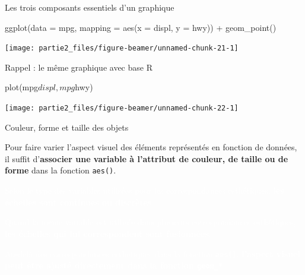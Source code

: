 \documentclass[12pt,ignorenonframetext,]{beamer}
\newenvironment{Shaded}{}{}
\newcommand{\KeywordTok}[1]{\textcolor[rgb]{0.00,0.00,1.00}{#1}}
\newcommand{\DataTypeTok}[1]{#1}
\newcommand{\StringTok}[1]{\textcolor[rgb]{0.00,0.50,0.50}{#1}}
\newcommand{\OperatorTok}[1]{#1}
\newcommand{\NormalTok}[1]{#1}
\renewenvironment{Shaded}{\begin{snugshade}}{\end{snugshade}}
\begin{document}
\begin{frame}[fragile]{\large Les trois composants essentiels d'un
graphique}

\center \small 

\begin{Shaded}
\begin{Highlighting}[]
\KeywordTok{ggplot}\NormalTok{(}\DataTypeTok{data =}\NormalTok{ mpg, }\DataTypeTok{mapping =} \KeywordTok{aes}\NormalTok{(}\DataTypeTok{x =}\NormalTok{ displ, }\DataTypeTok{y =}\NormalTok{ hwy)) }\OperatorTok{+}
\StringTok{  }\KeywordTok{geom_point}\NormalTok{()}
\end{Highlighting}
\end{Shaded}

\texttt{[image: partie2\_files/figure-beamer/unnamed-chunk-21-1]}

\end{frame}

\begin{frame}[fragile]{\large Rappel : le même graphique avec base R}

\centering \footnotesize

\begin{Shaded}
\begin{Highlighting}[]
\KeywordTok{plot}\NormalTok{(mpg}\OperatorTok{$}\NormalTok{displ, mpg}\OperatorTok{$}\NormalTok{hwy)}
\end{Highlighting}
\end{Shaded}

\texttt{[image: partie2\_files/figure-beamer/unnamed-chunk-22-1]}

\end{frame}

\begin{frame}{Couleur, forme et taille des objets}

Pour faire varier l'aspect visuel des éléments représentés en fonction
de données, il suffit
d'\textbf{associer une variable à l'attribut de couleur, de taille ou de forme}
dans la fonction \texttt{aes()}.

\textcolor{white}{Selon le type des variables utilisées pour les correspondances esthétiques, \textbf{les échelles sont continues ou discrètes}.}

\textcolor{white}{Quand la même variable est utilisée dans plusieurs correspondances esthétiques, \textbf{les échelles qui lui correspondent sont fusionnées}.}

\textcolor{white}{Au-delà des correspondances esthétiques dans la fonction \texttt{aes()}, \textbf{l'aspect visuel peut être ajusté directement dans la fonction \texttt{geom\_*}}.}

\end{frame}
\end{document}
